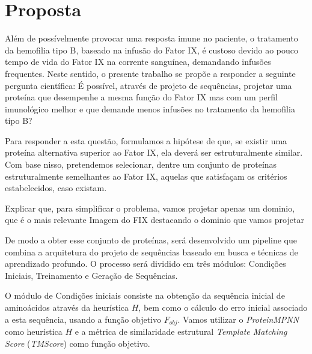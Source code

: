 \section{Proposta} 
\label{section:Proposta}
Além de possívelmente provocar uma resposta imune no paciente, 
o tratamento da hemofilia tipo B, baseado na infusão do Fator IX, é custoso devido ao pouco tempo de vida do Fator IX na corrente sanguínea, demandando infusões frequentes. 
Neste sentido, o presente trabalho se propõe a responder a seguinte pergunta científica: 
É possível, através de projeto de sequências, projetar uma proteína que desempenhe a mesma função do Fator IX mas com 
um perfil imunológico melhor e que demande menos infusões no tratamento da hemofilia tipo B?

Para responder a esta questão, formulamos a hipótese de que, 
se existir uma proteína alternativa superior ao Fator IX, 
ela deverá ser estruturalmente similar. 
Com base nisso, pretendemos selecionar, dentre um conjunto de proteínas estruturalmente semelhantes ao Fator IX,
aquelas que satisfaçam os critérios estabelecidos, caso existam.

{\color{red} Explicar que, para simplificar o problema, vamos projetar apenas um dominio, que é o mais relevante}
{\color{red} Imagem do FIX destacando o dominio que vamos projetar}

De modo a obter esse conjunto de proteínas, será desenvolvido um pipeline que combina a arquitetura do projeto de sequências baseado em busca e técnicas de aprendizado profundo.
O processo será dividido em três módulos: Condições Iniciais, Treinamento e Geração de Sequências. 

O módulo de Condições iniciais consiste na obtenção da sequência inicial de aminoácidos através da heurística $H$, bem como o cálculo do erro inicial associado a esta sequência, usando a função objetivo $F_{obj}$. 
Vamos utilizar o \textit{ProteinMPNN} como heurística $H$ e a métrica de similaridade estrutural \textit{Template Matching Score} (\textit{TMScore}) como função objetivo.

